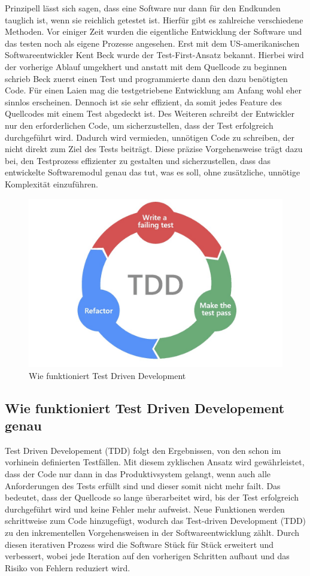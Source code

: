 Prinzipell lässt sich sagen, dass eine Software nur dann für den Endkunden tauglich ist, wenn sie reichlich getestet ist. Hierfür gibt es zahlreiche verschiedene Methoden. Vor einiger Zeit wurden die eigentliche Entwicklung der Software und das testen noch als eigene Prozesse angesehen. Erst mit dem US-amerikanischen Softwareentwickler Kent Beck wurde der Test-First-Ansatz bekannt. Hierbei wird der vorherige Ablauf umgekhert und anstatt mit dem Quellcode zu beginnen schrieb Beck zuerst einen Test und programmierte dann den dazu benötigten Code. Für einen Laien mag die testgetriebene Entwicklung am Anfang wohl eher sinnlos erscheinen. Dennoch ist sie sehr effizient, da somit jedes Feature des Quellcodes mit einem Test abgedeckt ist. Des Weiteren schreibt der Entwickler nur den erforderlichen Code, um sicherzustellen, dass der Test erfolgreich durchgeführt wird. Dadurch wird vermieden, unnötigen Code zu schreiben, der nicht direkt zum Ziel des Tests beiträgt. Diese präzise Vorgehensweise trägt dazu bei, den Testprozess effizienter zu gestalten und sicherzustellen, dass das entwickelte Softwaremodul genau das tut, was es soll, ohne zusätzliche, unnötige Komplexität einzuführen.

\begin{figure}
    \centering
    \includegraphics[width=0.5\linewidth]{pics/tdd.jpeg}
    \caption{Wie funktioniert Test Driven Development}
    \label{fig:enter-label}
\end{figure}

\subsection{Wie funktioniert Test Driven Developement genau}

Test Driven Developement (TDD) folgt den Ergebnissen, von den schon im vorhinein definierten Testfällen. Mit diesem zyklischen Ansatz wird gewährleistet, dass der Code nur dann in das Produktivsystem gelangt, wenn auch alle Anforderungen des Tests erfüllt sind und dieser somit nicht mehr failt. Das bedeutet, dass der Quellcode so lange überarbeitet wird, bis der Test erfolgreich durchgeführt wird und keine Fehler mehr aufweist. Neue Funktionen werden schrittweise zum Code hinzugefügt, wodurch das Test-driven Development (TDD) zu den inkrementellen Vorgehensweisen in der Softwareentwicklung zählt. Durch diesen iterativen Prozess wird die Software Stück für Stück erweitert und verbessert, wobei jede Iteration auf den vorherigen Schritten aufbaut und das Risiko von Fehlern reduziert wird.

\cite{Was_ist_TDD}

